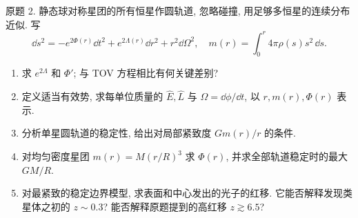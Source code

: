 \begin{exercise}\label{ps:11.2}
原题 2. 静态球对称星团的所有恒星作圆轨道, 忽略碰撞, 用足够多恒星的连续分布近似. 写
\[
\dd s^2=-e^{2\Phi(r)}\dd t^2+e^{2\Lambda(r)}\dd r^2+r^2\dd\Omega^2,
\quad m(r)=\int_0^r4\pi\rho(s)s^2\,\dd s.
\]
\begin{enumerate}[label=(\alph*)]
\item 求 $e^{2\Lambda}$ 和 $\Phi'$; 与 TOV 方程相比有何关键差别?
\item 定义适当有效势, 求每单位质量的 $\hat E,\hat L$ 与 $\Omega=\dd\phi/\dd t$, 以 $r,m(r),\Phi(r)$ 表示.
\item 分析单星圆轨道的稳定性, 给出对局部紧致度 $Gm(r)/r$ 的条件.
\item 对均匀密度星团 $m(r)=M(r/R)^3$ 求 $\Phi(r)$, 并求全部轨道稳定时的最大 $GM/R$.
\item 对最紧致的稳定边界模型, 求表面和中心发出的光子的红移. 它能否解释发现类星体之初的 $z\sim0.3$? 能否解释原题提到的高红移 $z\gtrsim6.5$?
\end{enumerate}
\end{exercise}
